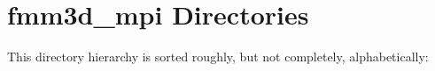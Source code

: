 \section{fmm3d\_\-mpi Directories}
This directory hierarchy is sorted roughly, but not completely, alphabetically:\begin{CompactList}
\item {}
\end{CompactList}
